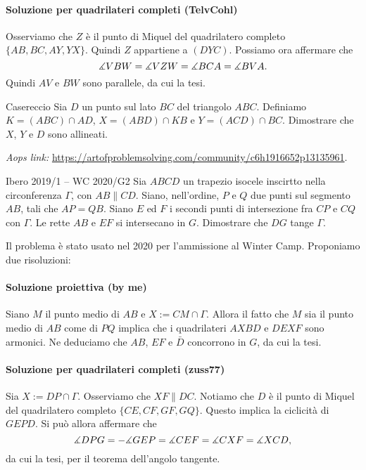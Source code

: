 \documentclass{article}
\begin{document}
\paragraph{Soluzione per quadrilateri completi (TelvCohl)}
Osserviamo che $Z$ è il punto di Miquel del quadrilatero completo
$\{ AB, BC, AY, YX \}$. Quindi $Z$ appartiene a $(DYC)$. Possiamo ora
affermare che
\begin{equation*}
	\measuredangle{VBW}=\measuredangle{VZW}=\measuredangle{BCA}=\measuredangle{BVA}.
\end{equation*}
Quindi $AV$ e $BW$ sono parallele, da cui la tesi.

\begin{proposition}{Casereccio}{}
	Sia $D$ un punto sul lato $BC$ del triangolo $ABC$. Definiamo
	$K=(ABC)\cap AD$, $X=(ABD)\cap KB$ e $Y=(ACD)\cap BC$.
	Dimostrare che $X$, $Y$ e $D$
	sono allineati.
\end{proposition}

\vspace{0.5cm}
\textit{Aops link:}
\href{https://artofproblemsolving.com/community/c6h1916652p13135961}
{https://artofproblemsolving.com/community/c6h1916652p13135961}.

\begin{proposition}{Ibero 2019/1 -- WC 2020/G2}{}
	Sia $ABCD$ un trapezio isocele inscirtto nella circonferenza $\Gamma$,
	con $AB\parallel CD$.
	Siano, nell'ordine, $P$ e $Q$ due punti sul segmento $AB$, tali che
	$AP=QB$. Siano $E$ ed $F$ i secondi punti di intersezione fra $CP$ e $CQ$
	con $\Gamma$. Le rette $AB$ e $EF$ si intersecano in $G$. Dimostrare che
	$DG$ tange $\Gamma$.
\end{proposition}

Il problema è stato usato nel 2020 per l'ammissione al Winter Camp.
Proponiamo due risoluzioni:

\paragraph{Soluzione proiettiva (by me)}
Siano $M$ il punto medio di $AB$ e $X:=CM\cap \Gamma$.
Allora il fatto che $M$ sia il punto medio di $AB$ come di $PQ$ implica
che i quadrilateri $AXBD$ e $DEXF$ sono armonici. Ne deduciamo che
$AB$, $EF$ e $\bar{D}$ concorrono in $G$, da cui la tesi.

\paragraph{Soluzione per quadrilateri completi (zuss77)}
Sia $X:=DP\cap \Gamma$. Osserviamo che $XF\parallel DC$.
Notiamo che $D$ è il punto di Miquel del quadrilatero completo
$\{ CE, CF, GF, GQ \}$. Questo implica la ciclicità di $GEPD$.
Si può allora affermare che
\begin{equation*}
	\measuredangle{DPG}=-\measuredangle{GEP}=\measuredangle{CEF}=\measuredangle{CXF}=\measuredangle{XCD},
\end{equation*}
da cui la tesi, per il teorema dell'angolo tangente.
\end{document}
